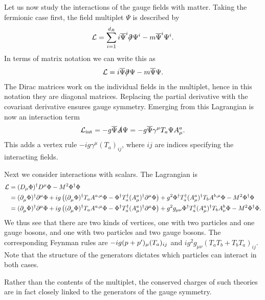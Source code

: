 Let us now study the interactions of the gauge fields with matter. Taking the fermionic case first, the field multiplet $\Psi$ is described by
\begin{align*}
	\mathcal{L} = \sum\limits_{i = 1}^{d_{R}}i\overline{\Psi}^{i}\slashed{\partial^{}_{}}\Psi^{i} - m\overline{\Psi}^{i}\Psi^{i}.
\end{align*}
In terms of matrix notation we can write this as
\begin{align*}
	\mathcal{L} = i\overline{\Psi}\slashed{\partial^{}_{}}\Psi - m\overline{\Psi}\Psi.
\end{align*}
The Dirac matrices work on the individual fields in the multiplet, hence in this notation they are diagonal matrices. Replacing the partial derivative with the covariant derivative ensures gauge symmetry. Emerging from this Lagrangian is now an interaction term
\begin{align*}
	\mathcal{L}_{\text{int}} = -g\overline{\Psi}\slashed{A}\Psi = -g\overline{\Psi}\gamma^{\mu}T_{a}\Psi A_{\mu}^{a}.
\end{align*}
This adds a vertex rule $-ig\gamma^{\mu}(T_{a})_{ij}$, where $ij$ are indices specifying the interacting fields.

Next we consider interactions with scalars. The Lagrangian is
\begin{align*}
	\mathcal{L} &= (D_{\mu}\Phi)^{\dagger} D^{\mu}\Phi - M^{2}\Phi^{\dagger}\Phi \\
	     &= (\partial^{}_{\mu}\Phi)^{\dagger} \partial^{\mu}_{}\Phi + ig\left((\partial^{}_{\mu}\Phi)^{\dagger} T_{a}A^{a, \mu}\Phi - \Phi^{\dagger} T_{a}^{\dagger} (A_{\mu}^{a})^{\dagger}\partial^{\mu}_{}\Phi\right) + g^{2}\Phi^{\dagger} T_{a}^{\dagger} (A_{\mu}^{a})^{\dagger} T_{b}A^{b, \mu}\Phi - M^{2}\Phi^{\dagger}\Phi \\
	     &= (\partial^{}_{\mu}\Phi)^{\dagger} \partial^{\mu}_{}\Phi + ig\left((\partial^{}_{\mu}\Phi)^{\dagger} T_{a}A^{a, \mu}\Phi - \Phi^{\dagger} T_{a}^{\dagger} (A_{\mu}^{a})^{\dagger}\partial^{\mu}_{}\Phi\right) + g^{2}g_{\mu\nu}\Phi^{\dagger} T_{a}^{\dagger} (A_{\mu}^{a})^{\dagger} T_{b}A_{\nu}^{b}\Phi - M^{2}\Phi^{\dagger}\Phi.
\end{align*}
We thus see that there are two kinds of vertices, one with two particles and one gauge bosons, and one with two particles and two gauge bosons. The corresponding Feynman rules are $-ig(p + p^{\prime})_{\mu}(T_{a})_{ij}$ and $ig^{2}g_{\mu\nu}(T_{a}T_{b} + T_{b}T_{a})_{ij}$. Note that the structure of the generators dictates which particles can interact in both cases.

Rather than the contents of the multiplet, the conserved charges of such theories are in fact closely linked to the generators of the gauge symmetry. 

